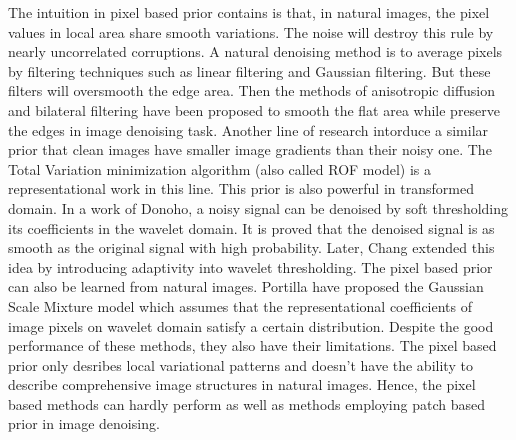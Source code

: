 \documentclass[10pt,twocolumn,letterpaper]{article}
\begin{document}
The intuition in pixel based prior contains is that, in natural images, the pixel values in local area share smooth variations. The noise will destroy this rule by nearly uncorrelated corruptions. A natural denoising method is to average pixels by filtering techniques such as linear filtering and Gaussian filtering. But these filters will oversmooth the edge area. Then the methods of anisotropic diffusion\cite{PeronaMalik1990} and bilateral filtering\cite{Tomasi1998} have been proposed to smooth the flat area while preserve the edges in image denoising task. Another line of research intorduce a similar prior that clean images have smaller image gradients than their noisy one. The Total Variation minimization algorithm (also called ROF model)\cite{rudin1992nonlinear} is a representational work in this line. This prior is also powerful in transformed domain. In a work\cite{Idealspatial} of Donoho, a noisy signal can be denoised by soft thresholding its coefficients in the wavelet domain. It is proved that the denoised signal is as smooth as the original signal with high probability\cite{softthresholding}. Later, Chang \etal extended this idea by introducing adaptivity into wavelet thresholding\cite{bayesshrink}. The pixel based prior can also be learned from natural images. Portilla \etal have proposed the Gaussian Scale Mixture model\cite{blsgsm} which assumes that the representational coefficients of image pixels on wavelet domain satisfy a certain distribution. Despite the good performance of these methods, they also have their limitations. The pixel based prior only desribes local variational patterns and doesn't have the ability to describe comprehensive image structures in natural images. Hence, the pixel based methods can hardly perform as well as methods employing patch based prior in image denoising.
\end{document}
